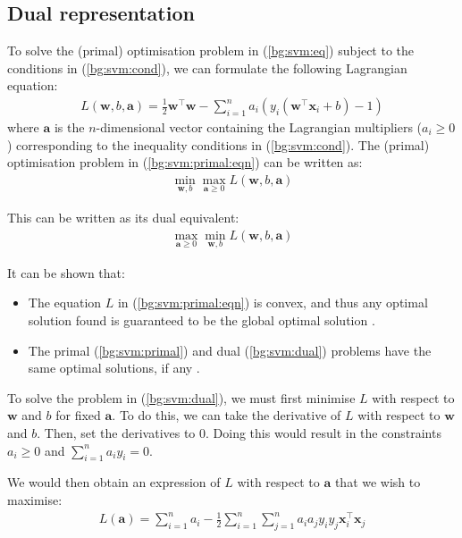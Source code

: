\documentclass[12pt, twoside, a4paper]{report}
\def\vec{\boldsymbol}
\begin{document}
\subsection{Dual representation}
To solve the (primal) optimisation problem in (\ref{bg:svm:eq}) subject to the conditions in (\ref{bg:svm:cond}), we can formulate the following Lagrangian equation:
\begin{align}
L(\boldsymbol w, b, \boldsymbol a)
= \frac{1}{2} \boldsymbol w^\top \boldsymbol w - \sum_{i=1}^n a_i (y_i(\boldsymbol w^\top \boldsymbol x_i + b) - 1) \label{bg:svm:primal:eqn}
\end{align}
where $\boldsymbol a$ is the $n$-dimensional vector containing the Lagrangian multipliers ($a_i \geq 0$) corresponding to the inequality conditions in (\ref{bg:svm:cond}). The (primal) optimisation problem in (\ref{bg:svm:primal:eqn}) can be written as:
\begin{align}
\min_{\boldsymbol w, b} \max_{\boldsymbol a \geq 0} L(\boldsymbol w, b, \vec a) \label{bg:svm:primal}
\end{align}

This can be written as its dual equivalent:
\begin{align}
\max_{\vec a \geq 0} \min_{\vec w, b} L(\vec w, b, \vec a) \label{bg:svm:dual}
\end{align}

It can be shown that:
\begin{itemize}
\item The equation $L$ in (\ref{bg:svm:primal:eqn}) is convex, and thus any optimal solution found is guaranteed to be the global optimal solution \cite{RefWorks:123}.
\item The primal (\ref{bg:svm:primal}) and dual (\ref{bg:svm:dual}) problems have the same optimal solutions, if any \cite{RefWorks:124}.
\end{itemize}

To solve the problem in (\ref{bg:svm:dual}), we must first minimise $L$ with respect to $\vec w$ and $b$ for fixed $\vec a$. To do this, we can take the derivative of $L$ with respect to $\vec w$ and $b$. Then, set the derivatives to 0. Doing this would result in the constraints $a_i \geq 0$ and $\sum_{i=1}^n a_i y_i = 0$.

We would then obtain an expression of $L$ with respect to $\vec a$ that we wish to maximise:
\begin{align*}
L(\vec a) = \sum_{i=1}^n a_i - \frac{1}{2} \sum_{i=1}^n \sum_{j=1}^n a_i a_j y_i y_j \vec{x}_i^\top \vec{x}_j
\end{align*}
\end{document}
